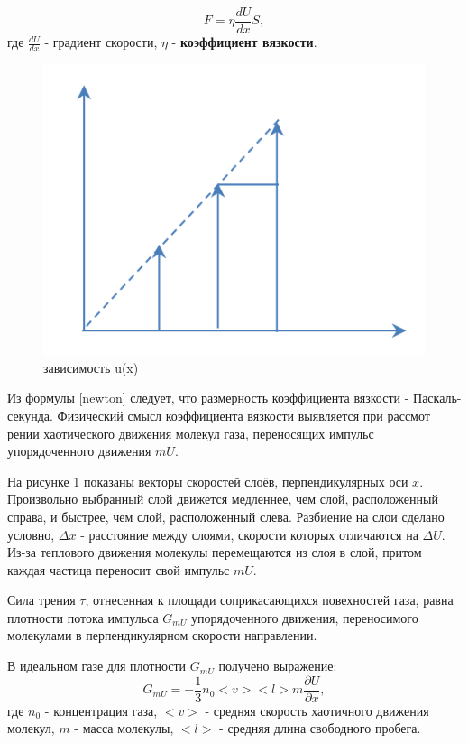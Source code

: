 \documentclass[a4paper,12pt]{article}
\begin{document}
\begin{equation}\label{newton}
F = \eta\frac{dU}{dx}S,
\end{equation}
где $\frac{dU}{dx}$ - градиент скорости, $\eta$ - \textbf{коэффициент вязкости}.

\begin{figure}[h!]
\begin{center}
	\includegraphics[scale=0.3]{1}
\end{center}
\caption{зависимость u(x)}
\end{figure}


Из формулы \eqref{newton} следует, что размерность коэффициента вязкости - Паскаль-секунда.
Физический смысл коэффициента вязкости выявляется при рассмот
рении хаотического движения молекул газа, переносящих импульс упорядоченного движения $mU$.

На рисунке 1 показаны векторы скоростей слоёв, перпендикулярных оси $x$. Произвольно выбранный слой движется медленнее, чем слой, расположенный справа, и быстрее, чем слой, расположенный слева. Разбиение на слои сделано условно, $\Delta x$ - расстояние между слоями, скорости которых отличаются на $\Delta U$. Из-за теплового движения молекулы перемещаются из слоя в слой, притом каждая частица переносит свой импульс $mU$.

Сила трения $\tau$, отнесенная к площади соприкасающихся повехностей газа, равна плотности потока импульса $G_{mU}$ упорядоченного движения, переносимого молекулами в перпендикулярном скорости направлении.

В идеальном газе для плотности $G_{mU}$ получено выражение:
\begin{equation}
G_{mU} = -\frac{1}{3}n_0<v><l>m\frac{\partial U}{\partial x},
\end{equation}
где $n_0$ - концентрация газа, $<v>$ - средняя скорость хаотичного движения молекул, $m$ - масса молекулы, $<l>$ - средняя длина свободного пробега.
\end{document}
